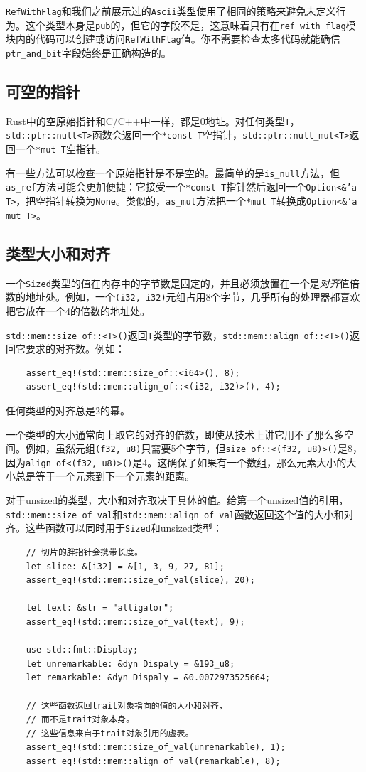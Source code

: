 \texttt{RefWithFlag}和我们之前展示过的\texttt{Ascii}类型使用了相同的策略来避免未定义行为。这个类型本身是\texttt{pub}的，但它的字段不是，这意味着只有在\texttt{ref\_with\_flag}模块内的代码可以创建或访问\texttt{RefWithFlag}值。你不需要检查太多代码就能确信\texttt{ptr\_and\_bit}字段始终是正确构造的。

\subsection{可空的指针}
Rust中的空原始指针和C/C++中一样，都是0地址。对任何类型\texttt{T}，\texttt{std::ptr::null<T>}函数会返回一个\texttt{*const T}空指针，\texttt{std::ptr::null\_mut<T>}返回一个\texttt{*mut T}空指针。

有一些方法可以检查一个原始指针是不是空的。最简单的是\texttt{is\_null}方法，但\texttt{as\_ref}方法可能会更加便捷：它接受一个\texttt{*const T}指针然后返回一个\texttt{Option<\&'a T>}，把空指针转换为\texttt{None}。类似的，\texttt{as\_mut}方法把一个\texttt{*mut T}转换成\texttt{Option<\&'a mut T>}。

\subsection{类型大小和对齐}
一个\texttt{Sized}类型的值在内存中的字节数是固定的，并且必须放置在一个是\emph{对齐}值倍数的地址处。例如，一个\texttt{(i32, i32)}元组占用8个字节，几乎所有的处理器都喜欢把它放在一个4的倍数的地址处。

\texttt{std::mem::size\_of::<T>()}返回\texttt{T}类型的字节数，\texttt{std::mem::align\_of::<T>()}返回它要求的对齐数。例如：
\begin{verbatim}
    assert_eq!(std::mem::size_of::<i64>(), 8);
    assert_eq!(std::mem::align_of::<(i32, i32)>(), 4);
\end{verbatim}

任何类型的对齐总是2的幂。

一个类型的大小通常向上取它的对齐的倍数，即使从技术上讲它用不了那么多空间。例如，虽然元组\texttt{(f32, u8)}只需要5个字节，但\texttt{size\_of::<(f32, u8)>()}是8，因为\texttt{align\_of<(f32, u8)>()}是4。这确保了如果有一个数组，那么元素大小的大小总是等于一个元素到下一个元素的距离。

对于unsized的类型，大小和对齐取决于具体的值。给第一个unsized值的引用，\texttt{std::mem::size\_of\_val}和\texttt{std::mem::align\_of\_val}函数返回这个值的大小和对齐。这些函数可以同时用于\texttt{Sized}和unsized类型：
\begin{verbatim}
    // 切片的胖指针会携带长度。
    let slice: &[i32] = &[1, 3, 9, 27, 81];
    assert_eq!(std::mem::size_of_val(slice), 20);

    let text: &str = "alligator";
    assert_eq!(std::mem::size_of_val(text), 9);

    use std::fmt::Display;
    let unremarkable: &dyn Dispaly = &193_u8;
    let remarkable: &dyn Dispaly = &0.0072973525664;

    // 这些函数返回trait对象指向的值的大小和对齐，
    // 而不是trait对象本身。
    // 这些信息来自于trait对象引用的虚表。
    assert_eq!(std::mem::size_of_val(unremarkable), 1);
    assert_eq!(std::mem::align_of_val(remarkable), 8);
\end{verbatim}

